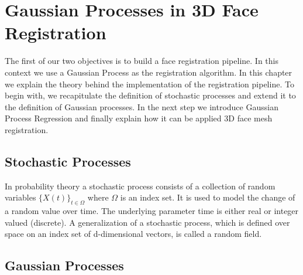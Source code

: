 \chapter{Gaussian Processes in 3D Face Registration}
\label{chap:GP}
The first of our two objectives is to build a face registration pipeline. In this context we use a Gaussian Process as the registration algorithm. In this chapter we explain the theory behind the implementation of the registration pipeline. To begin with, we recapitulate the definition
of stochastic processes and extend it to the definition of Gaussian processes. In the next step we introduce Gaussian Process Regression and finally explain how it can be applied 3D face mesh registration. 

\section{Stochastic Processes}

In probability theory a stochastic process consists of a collection of random variables $\{X(t)\}_{t \in \Omega}$ where $\Omega$ is an index set. It is used to model the change of a random value over time. The underlying parameter time is either real or integer valued (discrete). A generalization of a stochastic process, which is defined over space on an index set of d-dimensional vectors, is called a random field. 

\section{Gaussian Processes}

